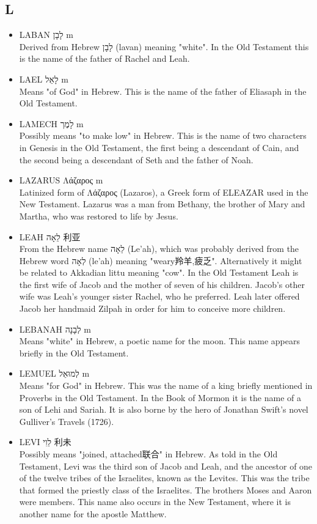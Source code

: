 \subsection{L}
\begin{itemize}
\itemsep-.5em 
\item LABAN לָבָן m \\
Derived from Hebrew לָבָן (lavan) meaning "white". In the Old Testament this is the name of the father of Rachel and Leah.
\item LAEL לָאֵל m \\
Means "of God" in Hebrew. This is the name of the father of Eliasaph in the Old Testament.
\item LAMECH לָמֶך m \\
Possibly means "to make low" in Hebrew. This is the name of two characters in Genesis in the Old Testament, the first being a descendant of Cain, and the second being a descendant of Seth and the father of Noah.
\item LAZARUS Λάζαρος m \\
Latinized form of Λάζαρος (Lazaros), a Greek form of ELEAZAR used in the New Testament. Lazarus was a man from Bethany, the brother of Mary and Martha, who was restored to life by Jesus.
\item LEAH לֵאָה 利亚\\
From the Hebrew name לֵאָה (Le'ah), which was probably derived from the Hebrew word לְאָה (le'ah) meaning "weary羚羊,疲乏". Alternatively it might be related to Akkadian littu meaning "cow". In the Old Testament Leah is the first wife of Jacob and the mother of seven of his children. Jacob's other wife was Leah's younger sister Rachel, who he preferred. Leah later offered Jacob her handmaid Zilpah in order for him to conceive more children.
\item LEBANAH לְבָנָה m \\
Means "white" in Hebrew, a poetic name for the moon. This name appears briefly in the Old Testament.
\item LEMUEL לְמוּאֵל m \\
Means "for God" in Hebrew. This was the name of a king briefly mentioned in Proverbs in the Old Testament. In the Book of Mormon it is the name of a son of Lehi and Sariah. It is also borne by the hero of Jonathan Swift's novel Gulliver's Travels (1726).
\item LEVI לֵוִי 利未 \\
Possibly means "joined, attached联合" in Hebrew. As told in the Old Testament, Levi was the third son of Jacob and Leah, and the ancestor of one of the twelve tribes of the Israelites, known as the Levites. This was the tribe that formed the priestly class of the Israelites. The brothers Moses and Aaron were members. This name also occurs in the New Testament, where it is another name for the apostle Matthew.

\end{itemize}

